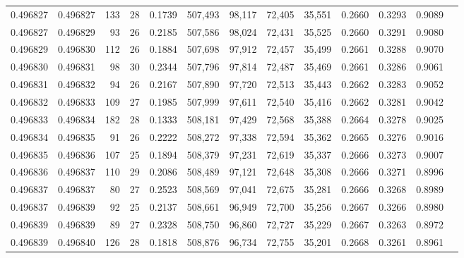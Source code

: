 \begin{tabular}{rrrrrrrrrrrrr}
0.496827 & 0.496827 & 133 &  28 &                                     0.1739 & 507,493 &  98,117 &  72,405 &  35,551 & 0.2660 & 0.3293 & 0.9089 \\
0.496827 & 0.496829 &  93 &  26 &                                     0.2185 & 507,586 &  98,024 &  72,431 &  35,525 & 0.2660 & 0.3291 & 0.9080 \\
0.496829 & 0.496830 & 112 &  26 &                                     0.1884 & 507,698 &  97,912 &  72,457 &  35,499 & 0.2661 & 0.3288 & 0.9070 \\
0.496830 & 0.496831 &  98 &  30 &                                     0.2344 & 507,796 &  97,814 &  72,487 &  35,469 & 0.2661 & 0.3286 & 0.9061 \\
0.496831 & 0.496832 &  94 &  26 &                                     0.2167 & 507,890 &  97,720 &  72,513 &  35,443 & 0.2662 & 0.3283 & 0.9052 \\
0.496832 & 0.496833 & 109 &  27 &                                     0.1985 & 507,999 &  97,611 &  72,540 &  35,416 & 0.2662 & 0.3281 & 0.9042 \\
0.496833 & 0.496834 & 182 &  28 &                                     0.1333 & 508,181 &  97,429 &  72,568 &  35,388 & 0.2664 & 0.3278 & 0.9025 \\
0.496834 & 0.496835 &  91 &  26 &                                     0.2222 & 508,272 &  97,338 &  72,594 &  35,362 & 0.2665 & 0.3276 & 0.9016 \\
0.496835 & 0.496836 & 107 &  25 &                                     0.1894 & 508,379 &  97,231 &  72,619 &  35,337 & 0.2666 & 0.3273 & 0.9007 \\
0.496836 & 0.496837 & 110 &  29 &                                     0.2086 & 508,489 &  97,121 &  72,648 &  35,308 & 0.2666 & 0.3271 & 0.8996 \\
0.496837 & 0.496837 &  80 &  27 &                                     0.2523 & 508,569 &  97,041 &  72,675 &  35,281 & 0.2666 & 0.3268 & 0.8989 \\
0.496837 & 0.496839 &  92 &  25 &                                     0.2137 & 508,661 &  96,949 &  72,700 &  35,256 & 0.2667 & 0.3266 & 0.8980 \\
0.496839 & 0.496839 &  89 &  27 &                                     0.2328 & 508,750 &  96,860 &  72,727 &  35,229 & 0.2667 & 0.3263 & 0.8972 \\
0.496839 & 0.496840 & 126 &  28 &                                     0.1818 & 508,876 &  96,734 &  72,755 &  35,201 & 0.2668 & 0.3261 & 0.8961 \\

\end{tabular}

